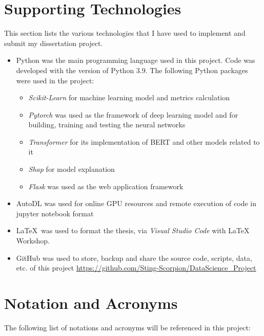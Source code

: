 \documentclass[ %
                    author={Bocheng Wang},
                supervisor={Dr. Qiang Liu},
                    degree={MSc},
                     title={A Research on Identification of Suicide Ideation in Texts with Multiple Models},
                      type={},
                      year={2024}]{dissertation}
\begin{document}

\chapter*{Supporting Technologies}
\noindent
This section lists the various technologies that I have used to implement and submit my dissertation project.

\begin{itemize}

\item Python was the main programming language used in this project. Code was developed with the version of Python 3.9. 
The following Python packages were used in the project:

\begin{itemize}
      \item {\em Scikit-Learn} for machine learning model and metrics calculation
      \item {\em Pytorch} was used as the framework of deep learning model and for building, training and testing the neural networks
      \item {\em Transformer} for its implementation of BERT and other models related to it
      \item {\em Shap} for model explanation
      \item {\em Flask} was used as the web application framework 
\end{itemize}

\item AutoDL was used for online GPU resources and remote execution of code in jupyter notebook format
 
\item \LaTeX\ was used to format the thesis, via {\em Visual Studio Code} with LaTeX Workshop. 

\item GitHub was used to store, backup and share the source code, scripts, data, etc. of this project
\url{https://github.com/Sting-Scorpion/DataScience_Project}

\end{itemize}


\chapter*{Notation and Acronyms}
\noindent
The following list of notations and acronyms will be referenced in this project:
\end{document}

